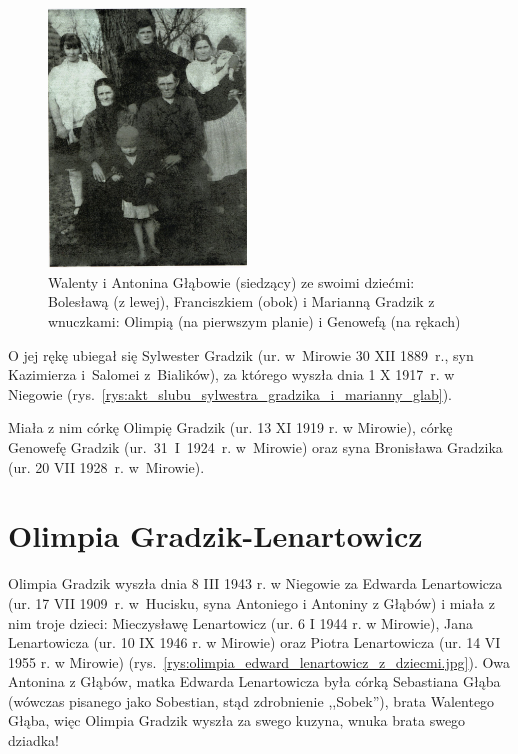 \begin{figure}[!hb]
\begin{center}
\includegraphics[width=0.47\textwidth]{zdjecia/walenty_antonina_marianna_olimpia.jpg}
\caption[Walenty i Antonina Głąbowie z dziećmi: Bolesławą, Franciszkiem i Marianną Gradzik z jej córkami: Olimpią i Genowefą]{Walenty i Antonina Głąbowie (siedzący) ze swoimi dziećmi: Bolesławą (z lewej), Franciszkiem (obok) i Marianną Gradzik z wnuczkami: Olimpią (na pierwszym planie) i Genowefą (na rękach)}
\label{rys:walenty_antonina_marianna_olimpia}
\end{center}
\end{figure}

O jej rękę ubiegał się Sylwester Gradzik (ur. w~Mirowie 30 XII 1889~r., syn Kazimierza i~Salomei z~Bialików), za którego wyszła dnia 1 X 1917~r. w Niegowie (rys.~\ref{rys:akt_slubu_sylwestra_gradzika_i_marianny_glab}).

Miała z nim córkę Olimpię Gradzik (ur. 13 XI 1919 r. w Mirowie), córkę Genowefę Gradzik (ur.~31~I~1924~r. w~Mirowie) oraz syna Bronisława Gradzika (ur. 20 VII 1928~r. w~Mirowie).

\section{Olimpia Gradzik-Lenartowicz}
Olimpia Gradzik wyszła dnia 8 III 1943 r. w Niegowie za Edwarda Lenartowicza (ur. 17 VII 1909~r. w~Hucisku, syna Antoniego i Antoniny z Głąbów) i miała z nim troje dzieci: Mieczysławę Lenartowicz (ur. 6 I 1944 r. w Mirowie), Jana Lenartowicza (ur. 10 IX 1946 r. w Mirowie) oraz Piotra Lenartowicza (ur. 14 VI  1955 r. w Mirowie) (rys.~\ref{rys:olimpia_edward_lenartowicz_z_dziecmi.jpg}). Owa Antonina z Głąbów, matka Edwarda Lenartowicza była córką Sebastiana Głąba (wówczas pisanego jako Sobestian, stąd zdrobnienie ,,Sobek''), brata Walentego Głąba, więc Olimpia Gradzik wyszła za swego kuzyna, wnuka brata swego dziadka!

